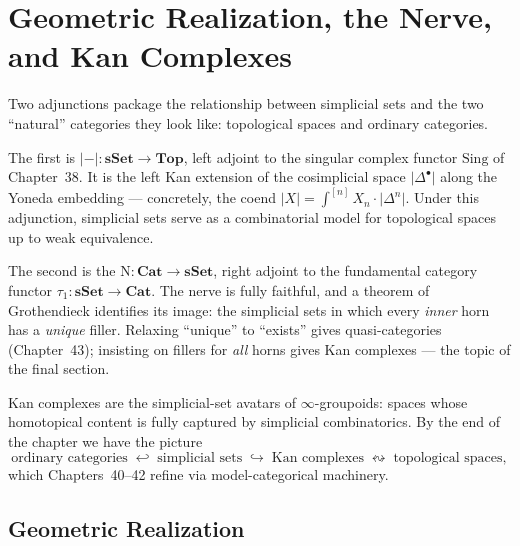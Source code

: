 
\chapter{Geometric Realization, the Nerve, and Kan Complexes}

\begin{overviewbox}
Two adjunctions package the relationship between simplicial sets and the
two ``natural'' categories they look like: topological spaces and
ordinary categories.

The first is  $\lvert{-}\rvert :
\mathbf{sSet} \to \mathbf{Top}$, left adjoint to the singular complex
functor $\mathrm{Sing}$ of Chapter~38. It is the left Kan extension of
the cosimplicial space $\lvert\Delta^\bullet\rvert$ along the Yoneda
embedding — concretely, the coend $\lvert X\rvert = \int^{[n]} X_n \cdot
\lvert\Delta^n\rvert$. Under this adjunction, simplicial sets serve as a
combinatorial model for topological spaces up to weak equivalence.

The second is the  $\mathrm{N} : \mathbf{Cat} \to \mathbf{sSet}$,
right adjoint to the fundamental category functor $\tau_1 : \mathbf{sSet}
\to \mathbf{Cat}$. The nerve is fully faithful, and a theorem of
Grothendieck identifies its image: the simplicial sets in which every
\emph{inner} horn has a \emph{unique} filler. Relaxing ``unique'' to
``exists'' gives quasi-categories (Chapter~43); insisting on fillers for
\emph{all} horns gives Kan complexes — the topic of the final section.

Kan complexes are the simplicial-set avatars of $\infty$-groupoids:
spaces whose homotopical content is fully captured by simplicial
combinatorics. By the end of the chapter we have the picture
\begin{equation*}
  \text{ordinary categories} \;\hookleftarrow\; \text{simplicial sets} \;\hookrightarrow\;
  \text{Kan complexes} \;\leftrightsquigarrow\; \text{topological spaces},
\end{equation*}
which Chapters~40--42 refine via model-categorical machinery.
\end{overviewbox}


\section{Geometric Realization}
\label{sec:geometric-realization}

